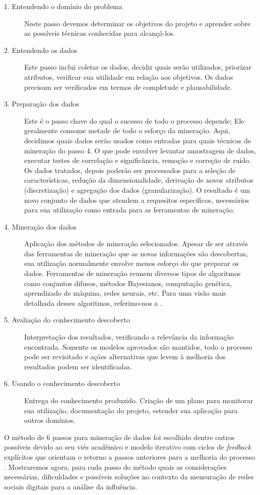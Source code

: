 \begin{description}
\item[1. Entendendo o domínio do problema]Neste passo devemos determinar os
objetivos do projeto e aprender sobre as possíveis técnicas conhecidas
para alcançá-los.
\item[2. Entendendo os dados]Este passo inclui coletar os dados, decidir quais
serão utilizados, priorizar atributos, verificar sua utilidade em relação aos
objetivos. Os dados precisam ser verificados em termos de completude e
plausabilidade.
\item[3. Preparação dos dados]Este é o passo chave do qual o sucesso de todo o
processo depende; Ele geralmente consome metade de todo o esforço da mineração.
Aqui, decidimos quais dados serão usados como entradas para quais técnicas de
mineração do passo 4. O que pode envolver levantar amostragem de dados, executar
testes de correlação e significância, remoção e correção de ruído. Os dados
tratados, depois poderão ser processados para a seleção de características,
redução da dimensionalidade, derivação de novos atributos (discretização) e
agregação dos dados (granularização). O resultado é um novo conjunto de dados
que atendem a requesitos específicos, necessários para sua utilização como
entrada para as ferramentas de mineração.
\item[4. Mineração dos dados]Aplicação dos métodos de mineração selecionados.
Apesar de ser através das ferramentas de mineração que as novas informações
são descobertas, sua utilização normalmente envolve menos esforço do que
preparar os dados. Ferramentas de mineração reunem diversos tipos de algoritmos
como conjuntos difusos, métodos Bayesianos, computação genética,
aprendizado de máquina, redes neurais, etc. Para uma visão mais detalhada desses
algoritmos, referimo-nos a \cite{JiaweiHan2006}.
\item[5. Avaliação do conhecimento descoberto]Interpretação dos
resultados, verificando a relevância da informação encontrada. Somente os
modelos aprovados são mantidos, todo o processo pode ser revisitado e ações
alternativas que levem à melhoria dos resultados podem ser identificadas.
\item[6. Usando o conhecimento descoberto]Entrega do conhecimento produzido.
Criação de um plano para monitorar sua utilização, documentação do projeto,
estender sua aplicação para outros domínios.
\end{description}

O método de 6 passos para mineração de dados foi escolhido dentre outros
possíveis devido ao seu viés acadêmico e modelo iterativo com ciclos de
\emph{feedback} explícitos que orientam o retorno a passos anteriores para a
melhoria do processo \citep{KURGAN2006}. Mostraremos agora, para cada passo do
método quais as considerações necessárias, dificuldades e possíveis soluções no
contexto da mensuração de redes sociais digitais para a análise da influência.

